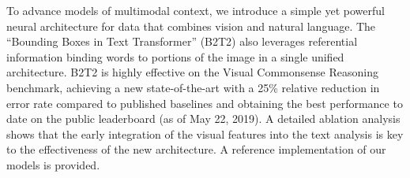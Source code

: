 To advance models of multimodal context, we introduce a simple yet powerful neural architecture for data that combines vision and natural language. The ``Bounding Boxes in Text Transformer'' (B2T2) also leverages referential information binding words to portions of the image in a single unified architecture. B2T2 is highly effective on the Visual Commonsense Reasoning benchmark, achieving a new state-of-the-art with a 25\% relative reduction in error rate compared to published baselines and obtaining the best performance to date on the public leaderboard  (as of May 22, 2019). A detailed ablation analysis shows that the early integration of the visual features into the text analysis is key to the effectiveness of the new architecture. A reference implementation of our models is provided.